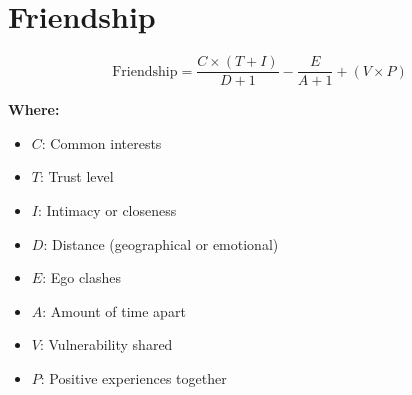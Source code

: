\chapter{Friendship}

\begin{equation}
\text{Friendship} = \frac{C \times (T+I)}{D + 1} - \frac{E}{A+1} + (V \times P)
\end{equation}

\textbf{Where:}

\begin{itemize}
    \item $C$: Common interests
    \item $T$: Trust level
    \item $I$: Intimacy or closeness 
    \item $D$: Distance (geographical or emotional) 
    \item $E$: Ego clashes
    \item $A$: Amount of time apart
    \item $V$: Vulnerability shared
    \item $P$: Positive experiences together
\end{itemize}